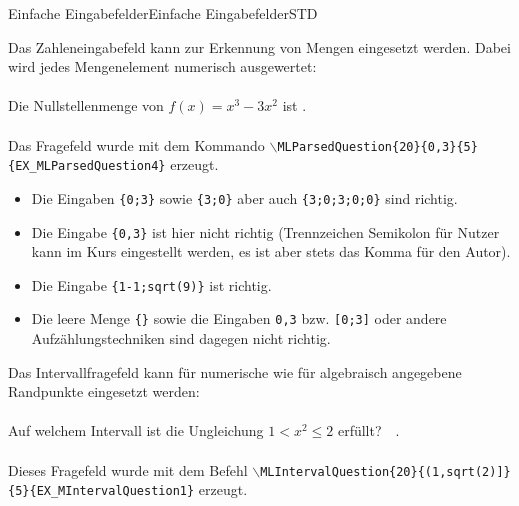 \begin{MXContent}{Einfache Eingabefelder}{Einfache Eingabefelder}{STD}
\begin{MExample}
Das Zahleneingabefeld kann zur Erkennung von Mengen eingesetzt werden. Dabei wird jedes Mengenelement numerisch ausgewertet:
\ \\ \ \\
Die Nullstellenmenge von $f(x)=x^3-3x^2$ ist \: .
\ \\ \ \\
Das Fragefeld wurde mit dem Kommando \texttt{$\backslash$MLParsedQuestion\{20\}\{0,3\}\{5\}\{EX\_MLParsedQuestion4\}} erzeugt.
\ \\
\begin{itemize}
\item{Die Eingaben \texttt{\{0;3\}} sowie \texttt{\{3;0\}} aber auch \texttt{\{3;0;3;0;0\}} sind richtig.}
\item{Die Eingabe \texttt{\{0,3\}} ist hier nicht richtig (Trennzeichen Semikolon für Nutzer kann im Kurs eingestellt werden, es ist aber stets das Komma für den Autor).}
\item{Die Eingabe \texttt{\{1-1;sqrt(9)\}} ist richtig.}
\item{Die leere Menge \texttt{\{\}} sowie die Eingaben \texttt{0,3} bzw. \texttt{[0;3]} oder andere Aufzählungstechniken sind dagegen nicht richtig.}
\end{itemize}
\end{MExample}

\begin{MExample}
Das Intervallfragefeld kann für numerische wie für algebraisch angegebene Randpunkte eingesetzt werden:
\ \\ \ \\
Auf welchem Intervall ist die Ungleichung $1<x^2\leq 2$ erfüllt?\ \ \MLIntervalQuestion{20}{(1,sqrt(2)]}{5}{EX_MIntervalQuestion1}.
\ \\ \ \\
Dieses Fragefeld wurde mit dem Befehl \texttt{$\backslash$MLIntervalQuestion\{20\}\{(1,sqrt(2)]\}\{5\}\{EX\_MIntervalQuestion1\}} erzeugt.
\end{MExample}

\end{MXContent}


